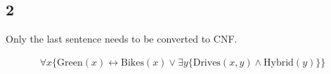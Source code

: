\subsection*{2}

Only the last sentence needs to be converted to CNF.

\begin{gather*}
    \forall x \{ \text{Green}(x) \leftrightarrow \text{Bikes}(x) \vee \exists y \{ \text{Drives}(x, y) \wedge \text{Hybrid}(y) \} \}
\end{gather*}
